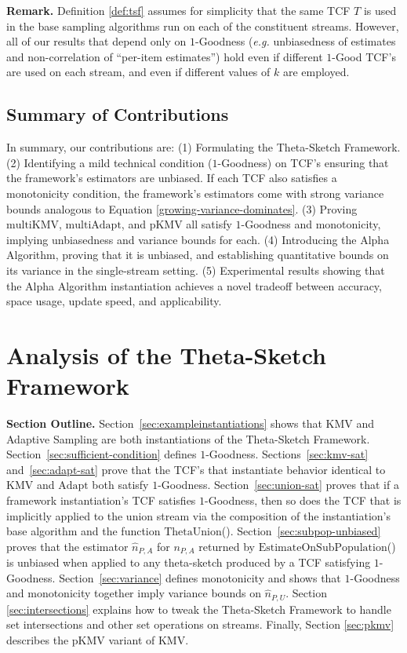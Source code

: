 \documentclass{article}
\newcommand{\romTS}{\hat{n}}
\newcommand{\pIKMV}{\mathrm{pKMV}}
\newcommand{\romKMV}{\mathrm{KMV}}
\newcommand{\romAdapt}{\mathrm{Adapt}}
\newcommand{\romIAdapt}{\mathrm{multiAdapt}}
\newcommand{\romIKMV}{\mathrm{multiKMV}}
\newcommand{\estonsub}{\mathrm{EstimateOnSubPopulation}}
\newcommand{\thetaunion}{\mathrm{ThetaUnion}}
\begin{document}
\medskip \noindent \textbf{Remark.}
Definition \ref{def:tsf} assumes for simplicity that the same TCF $T$ is used in the base sampling algorithms run 
on each of the constituent streams. However, all of our results that depend only on $1$-Goodness ({\em e.g.} unbiasedness
of estimates and non-correlation of ``per-item estimates'') hold even if different $1$-Good
TCF's are used on each stream, and even if different values of $k$ are employed.

\subsection{Summary of Contributions}
\label{sec:contributions}
In summary, our contributions are: (1) Formulating the Theta-Sketch Framework. (2) Identifying a mild technical condition ($1$-Goodness) on TCF's ensuring that the framework's estimators 
are unbiased. If each TCF also satisfies a monotonicity condition, the framework's estimators come with strong variance bounds analogous to Equation \eqref{growing-variance-dominates}. 
(3) Proving $\romIKMV$, $\romIAdapt$, and $\pIKMV$ all satisfy $1$-Goodness and monotonicity, implying unbiasedness and variance bounds for each.
(4) Introducing the Alpha Algorithm, proving that it is unbiased, 
and establishing quantitative bounds on its variance in the single-stream setting.
(5) Experimental results showing that the Alpha Algorithm instantiation achieves a novel tradeoff between accuracy, space usage, update speed, and applicability.



\section{Analysis of the Theta-Sketch Framework}
\label{sec:framework}
\noindent \textbf{Section Outline.} 
Section~\ref{sec:exampleinstantiations} shows that KMV and Adaptive Sampling are both instantiations of the Theta-Sketch Framework.
Section~\ref{sec:sufficient-condition} defines $1$-Goodness.
Sections~\ref{sec:kmv-sat} and~\ref{sec:adapt-sat} prove that the TCF's 
that instantiate behavior identical to $\romKMV$ and $\romAdapt$ both satisfy $1$-Goodness.
Section~\ref{sec:union-sat} proves that if a framework instantiation's
TCF satisfies $1$-Goodness, then so does the TCF that is implicitly applied to the union stream via the composition of the 
instantiation's base algorithm and the function $\thetaunion$(). 
Section~\ref{sec:subpop-unbiased} proves that the estimator $\romTS_{P, A}$ for $n_{P, A}$ returned by $\estonsub$()
is unbiased when applied to any theta-sketch produced by a TCF
satisfying $1$-Goodness. Section~\ref{sec:variance} defines monotonicity and shows that $1$-Goodness and monotonicity together imply variance bounds on $\romTS_{P, U}$. Section \ref{sec:intersections} explains how to tweak the Theta-Sketch Framework
to handle set intersections and other set operations on streams.
Finally, Section \ref{sec:pkmv} describes the $\pIKMV$ variant of KMV. 
\end{document}
